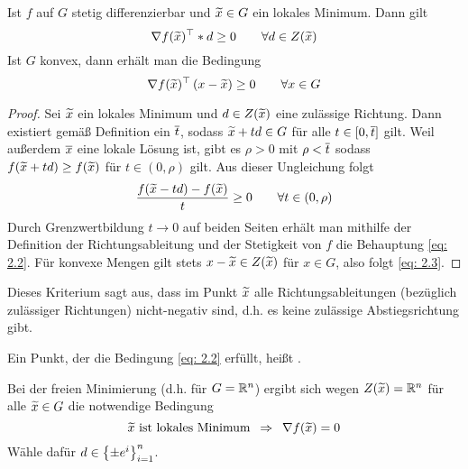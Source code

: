 \begin{aussage} %
	\label{aussage: 2.4}
	Ist $f$ auf $G$ stetig differenzierbar und $\widetilde{x} \in G$ ein lokales Minimum. Dann gilt
	\begin{equation} \label{eq: 2.2}
	\nabla f(\widetilde{x})^{\top} * d \ge 0 \qquad \forall d \in Z(\widetilde{x})
	\end{equation}
	Ist $G$ konvex, dann erhält man die Bedingung
	\begin{equation} \label{eq: 2.3}
	\nabla f(\widetilde{x})^{\top} \left( x - \widetilde{x} \right) \ge 0 \qquad \forall x \in G
	\end{equation}
\end{aussage}
\begin{proof}
	Sei $\widetilde{x}$ ein lokales Minimum und $d \in Z(\widetilde{x})$ eine zulässige Richtung. Dann existiert gemäß Definition ein $\overline{t}$, sodass $\widetilde{x} + td \in G$ für alle $t \in [0,\overline{t}]$ gilt. Weil außerdem $\overline{x}$ eine lokale Lösung ist, gibt es $\rho > 0$ mit $\rho < \overline{t}$ sodass $f(\widetilde{x} + td) \ge f(\widetilde{x})$ für $t \in (0,\rho)$ gilt. Aus dieser Ungleichung folgt
	\begin{equation*}
	\frac{f(\widetilde{x} - td) - f(\widetilde{x})}{t} \ge 0 \qquad \forall t \in (0,\rho)
	\end{equation*}
	Durch Grenzwertbildung $t \to 0$ auf beiden Seiten erhält man mithilfe der Definition der Richtungsableitung und der Stetigkeit von $f$ die Behauptung \eqref{eq: 2.2}.
	Für konvexe Mengen gilt stets $x - \widetilde{x} \in Z(\widetilde{x})$ für $x \in G$, also folgt \eqref{eq: 2.3}.
\end{proof}

Dieses Kriterium sagt aus, dass im Punkt $\widetilde{x}$ alle Richtungsableitungen (bezüglich zulässiger Richtungen) nicht-negativ sind, d.h. es keine zulässige Abstiegsrichtung gibt.

\begin{bemerkung} %
	Ein Punkt, der die Bedingung \eqref{eq: 2.2} erfüllt, heißt .
\end{bemerkung}

\begin{bemerkung} %
	Bei der freien Minimierung (d.h. für $G = \mathbb{R}^n$) ergibt sich wegen $Z(\widetilde{x}) = \mathbb{R}^n$ für alle $\widetilde{x} \in G$ die notwendige Bedingung
	\begin{equation*}
	\widetilde{x} \text{ ist lokales Minimum} \enskip \Rightarrow \enskip \nabla f(\widetilde{x}) = 0
	\end{equation*}
	Wähle dafür $d \in \left\{ \pm e^i \right\}_{i=1}^n$.
\end{bemerkung}

